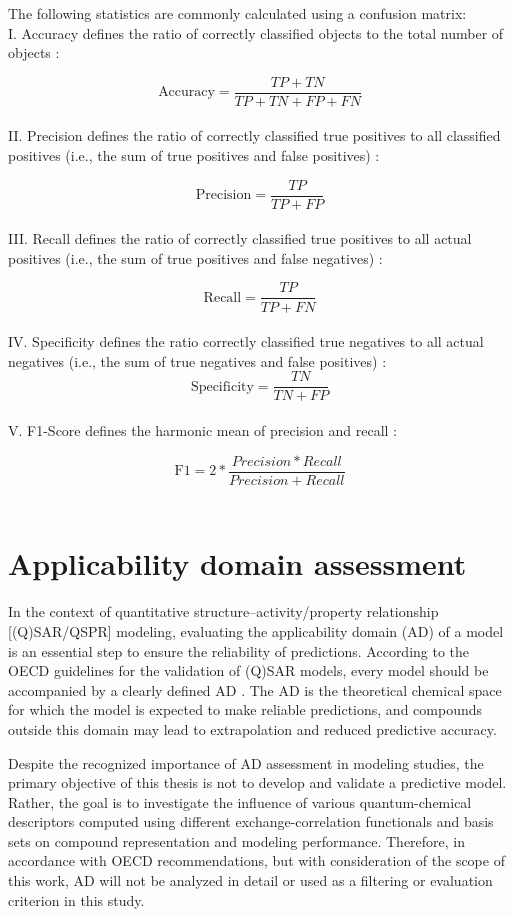 The following statistics are commonly calculated using a confusion matrix:\\

I. Accuracy defines the ratio of correctly classified objects to the total number of objects \cite{HiranK}:

\[
\text{Accuracy} = \frac{TP + TN}{TP + TN + FP + FN}
\]\\

\clearpage
II. Precision defines the ratio of correctly classified true positives to all classified positives (i.e., the sum of true positives and false positives) \cite{HiranK}:

\[
\text{Precision} = \frac{TP}{TP + FP}
\]\\

III. Recall defines the ratio of correctly classified true positives to all actual positives (i.e., the sum of true positives and false negatives) \cite{HiranK}:

\[
\text{Recall} = \frac{TP}{TP + FN}
\]\\

IV. Specificity defines the ratio correctly classified true negatives to all actual negatives (i.e., the sum of true negatives and false positives) \cite{HiranK}:
\[
\text{Specificity} = \frac{TN}{TN + FP}
\]\\

V. F1-Score defines the harmonic mean of precision and recall \cite{HiranK}:

\[
\text{F1} = 2*\frac{Precision * Recall}{Precision + Recall}
\]\\


\section{Applicability domain assessment}

In the context of quantitative structure–activity/property relationship [(Q)SAR/QSPR] modeling, evaluating the applicability domain (AD) of a model is an essential step to ensure the reliability of predictions. According to the OECD guidelines for the validation of (Q)SAR models, every model should be accompanied by a clearly defined AD \cite{OECD2004}. The AD is the theoretical chemical space for which the model is expected to make reliable predictions, and compounds outside this domain may lead to extrapolation and reduced predictive accuracy.

Despite the recognized importance of AD assessment in modeling studies, the primary objective of this thesis is not to develop and validate a predictive model. Rather, the goal is to investigate the influence of various quantum-chemical descriptors computed using different exchange-correlation functionals and basis sets on compound representation and modeling performance. Therefore, in accordance with OECD recommendations, but with consideration of the scope of this work, AD will not be analyzed in detail or used as a filtering or evaluation criterion in this study.
